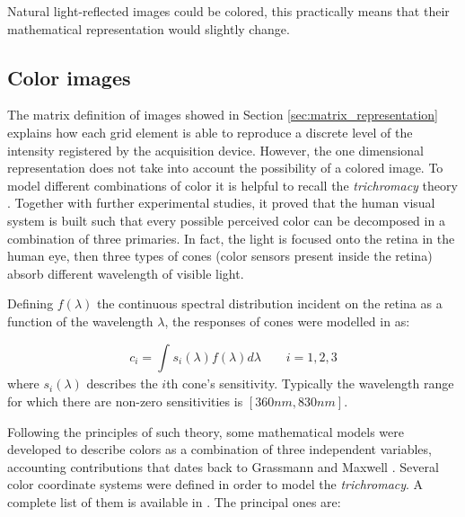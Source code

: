\documentclass[../main.tex]{subfiles}
\begin{document}
Natural light-reflected images could be colored, this practically means that their mathematical representation would slightly change.

\subsection{Color images}\label{sec:color-images}

The matrix definition of images showed in Section \ref{sec:matrix_representation} explains how each grid element is able to reproduce a discrete level of the intensity registered by the acquisition device. However, the one dimensional representation does not take into account the possibility of a colored image.
To model different combinations of color it is helpful to recall the \textit{trichromacy} theory \cite{young}. Together with further experimental studies, it proved that the human visual system is built such that every possible perceived color can be decomposed in a combination of three primaries. In fact, the light is focused onto the retina in the human eye, then three types of cones (color sensors present inside the retina) absorb different wavelength of visible light.

Defining $f(\lambda)$ the continuous spectral distribution incident on the retina as a function of the wavelength $\lambda$, the responses of cones were modelled in \cite{colors-images} as:

\begin{equation}
   c_{i} = \int_{}^{} s_{i}(\lambda)f(\lambda)d\lambda   \qquad i=1,2,3
\end{equation}
where $s_{i}(\lambda)$ describes the $i$th cone's sensitivity. Typically the wavelength range for which there are non-zero sensitivities is $[360 nm, 830 nm]$.

Following the principles of such theory, some mathematical models were developed to describe colors as a combination of three independent variables, accounting contributions that dates back to Grassmann \cite{grassmann1854theory} and Maxwell \cite{maxwell1856theory}.
Several color coordinate systems were defined in order to model the \textit{trichromacy}. A complete list of them is available in \cite{jain1989fundamentals}. The principal ones are:
\end{document}

